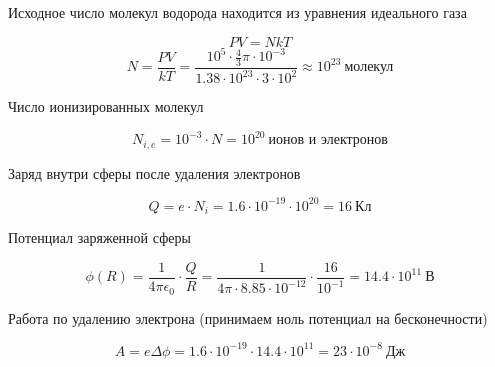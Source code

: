 \solutionSection

\begin{tabular}{l|}
    Дано: \\
    $R = 10$ см \\
    $\alpha = 0.1\%$ \\
    $e = 1.6 \cdot 10^{-19}$ Кл \\
    $k = 1.38 \cdot 10^{-23]$ Дж/К \\
    $\epsilon_0 = 8.85 \cdot 10^{-12}$ Ф/м \\
    $P_0 = 10^5$ Па \\
    $T= 300$ К \\
    \hline \\
    $A$ - ?
\end{tabular}

Исходное число молекул водорода находится из уравнения идеального газа

$$PV = NkT$$
$$N = \frac{PV}{kT} = \frac{10^5 \cdot \frac{4}{3} \pi \cdot 10^{-3}}{1.38 \cdot 10^{23} \cdot 3 \cdot 10^2} \approx 10^{23} \: \text{молекул}$$

Число ионизированных молекул

$$N_{i, e} = 10^{-3} \cdot N = 10^{20} \: \text{ионов и электронов}$$

Заряд внутри сферы после удаления электронов

$$Q = e \cdot N_i = 1.6 \cdot 10^{-19} \cdot 10^{20} = 16 \: \text{Кл}$$

Потенциал заряженной сферы

$$\phi(R) = \frac{1}{4 \pi \epsilon_0} \cdot \frac{Q}{R} = \frac{1}{4\pi \cdot 8.85 \cdot 10^{-12}} \cdot \frac{16}{10^{-1}} = 14.4 \cdot 10^{11} \: \text{В}$$

Работа по удалению электрона (принимаем ноль потенциал на бесконечности)

$$A = e \Delta \phi = 1.6 \cdot 10^{-19} \cdot 14.4 \cdot 10^{11} = 23 \cdot 10^{-8} \: \text{Дж}$$

